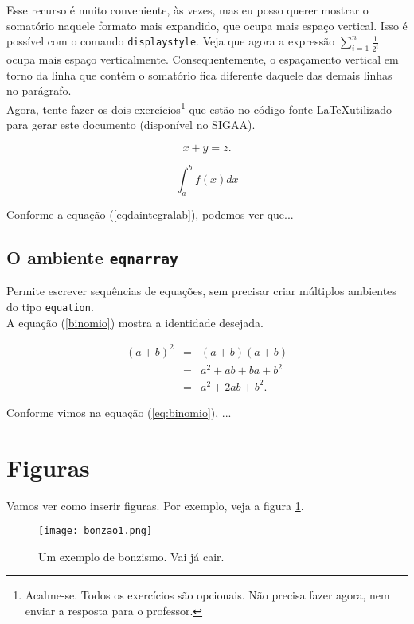 \documentclass{article}
\begin{document}
Esse recurso é muito conveniente, às vezes, mas eu posso querer mostrar o somatório naquele formato mais expandido, que ocupa mais espaço vertical. Isso é possível com o comando \texttt{displaystyle}. Veja que agora a expressão $\displaystyle \sum_{i=1}^{n} \frac{1}{2^i}$ ocupa mais espaço verticalmente. Consequentemente, o espaçamento vertical em torno da linha que contém o somatório fica diferente daquele das demais linhas no parágrafo.\\

Agora, tente fazer os dois exercícios\footnote{Acalme-se. Todos os exercícios são opcionais. Não precisa fazer agora, nem enviar a resposta para o professor.} que estão no código-fonte \LaTeX utilizado para gerar este documento (disponível no SIGAA).

\begin{equation}
    x + y = z.
\end{equation}

\begin{equation}
\int_{a}^{b} f(x)dx \label{eqdaintegralab}
\end{equation}

Conforme a equação (\ref{eqdaintegralab}), podemos ver que...

\subsection{O ambiente \texttt{eqnarray}}

Permite escrever sequências de equações, sem precisar criar múltiplos ambientes do tipo \texttt{equation}.\\

A equação (\ref{binomio}) mostra a identidade desejada.

\begin{eqnarray}
(a+b)^2 &=& (a+b)(a+b)\nonumber\\
&=& a^2 + ab + ba + b^2\nonumber\\
&=& a^2 + 2ab + b^2.\label{eq:binomio}
\end{eqnarray}

Conforme vimos na equação (\ref{eq:binomio}), ...

\section{Figuras}

Vamos ver como inserir figuras. Por exemplo, veja a figura \ref{fig:my_label}.

\begin{figure}[H]
    \centering
    \texttt{[image: bonzao1.png]}
    \caption{Um exemplo de bonzismo. Vai já cair.}
    \label{fig:my_label}
\end{figure}
\end{document}
